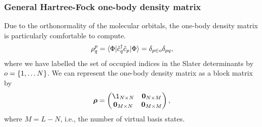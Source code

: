             \subsubsection{General Hartree-Fock one-body density matrix}
                Due to the orthonormality of the molecular orbitals, the
                one-body density matrix is particularly comfortable to compute.
                \begin{align}
                    \rho^{p}_{q}
                    = \langle \Phi |
                    \hat{c}_{q}^{\dagger}
                    \hat{c}_{p}
                    | \Phi \rangle
                    = \delta_{p \in o}\delta_{pq},
                \end{align}
                where we have labelled the set of occupied indices in the Slater
                determinants by $o = \left\{ 1, \dots N \right\}$.
                We can represent the one-body density matrix as a block matrix
                by
                \begin{align}
                    \vfg{\densityten}
                    = \begin{pmatrix}
                        \1_{N \times N} & \vfg{0}_{N \times M} \\
                        \vfg{0}_{M \times N} & \vfg{0}_{M \times M}
                    \end{pmatrix},
                \end{align}
                where $M = L - N$, i.e., the number of virtual basis states.

